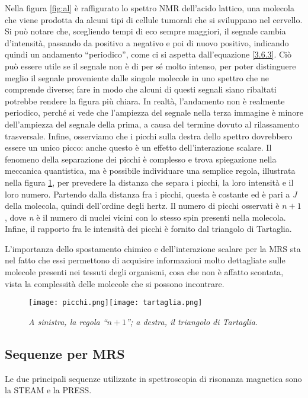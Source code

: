 \documentclass{report}
\newcommand{\virgolette}[1]{``#1''}
\newcommand{\figref}[1]{figura \ref{#1}}
\renewcommand{\eqref}[1]{equazione \ref{#1}}
\numberwithin{equation}{section}
\numberwithin{figure}{section}
\begin{document}
Nella \figref{fig:al} è raffigurato lo spettro NMR dell'acido lattico, una molecola che viene prodotta da alcuni tipi di cellule tumorali che si sviluppano nel cervello. Si può notare che, scegliendo tempi di eco sempre maggiori, il segnale cambia d'intensità, passando da positivo a negativo e poi di nuovo positivo, indicando quindi un andamento \virgolette{periodico}, come ci si aspetta dall'\eqref{3.6.3}. Ciò può essere utile se il segnale non è di per sé molto intenso, per poter distinguere meglio il segnale proveniente dalle singole molecole in uno spettro che ne comprende diverse; fare in modo che alcuni di questi segnali siano ribaltati potrebbe rendere la figura più chiara. In realtà, l'andamento non è realmente periodico, perché si vede che l'ampiezza del segnale nella terza immagine è minore dell'ampiezza del segnale della prima, a causa del termine dovuto al rilassamento trasversale. Infine, osserviamo che i picchi sulla destra dello spettro dovrebbero essere un unico picco: anche questo è un effetto dell'interazione scalare. Il fenomeno della separazione dei picchi è complesso e trova spiegazione nella meccanica quantistica, ma è possibile individuare una semplice regola, illustrata nella \figref{fig:picchi}, per prevedere la distanza che separa i picchi, la loro intensità e il loro numero. Partendo dalla distanza fra i picchi, questa è costante ed è pari a \textit{J} della molecola, quindi dell'ordine degli hertz. Il numero di picchi osservati è $n+1$, dove \textit{n} è il numero di nuclei vicini con lo stesso spin presenti nella molecola. Infine, il rapporto fra le intensità dei picchi è fornito dal triangolo di Tartaglia.

L'importanza dello spostamento chimico e dell'interazione scalare per la MRS sta nel fatto che essi permettono di acquisire informazioni molto dettagliate sulle molecole presenti nei tessuti degli organismi, cosa che non è affatto scontata, vista la complessità delle molecole che si possono incontrare.

\begin{figure}[htp]
\centering
\texttt{[image: picchi.png]}\quad\texttt{[image: tartaglia.png]}
\caption{\label{fig:picchi} \textit{A sinistra, la regola \virgolette{$n+1$}; a destra, il triangolo di Tartaglia}.}
\end{figure}

\subsection{Sequenze per MRS}
Le due principali sequenze utilizzate in spettroscopia di risonanza magnetica sono la STEAM e la PRESS.
\end{document}
